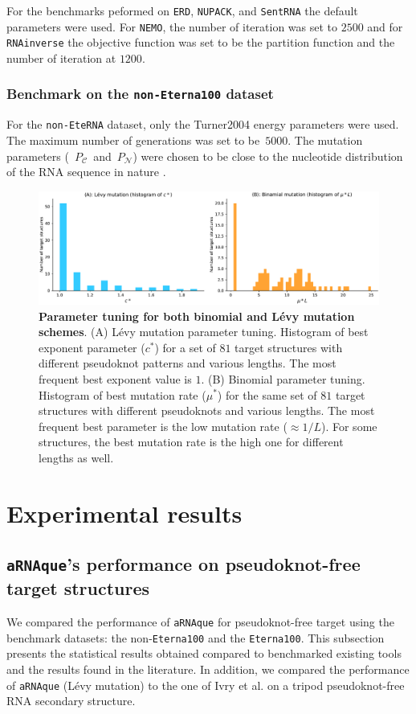 For the benchmarks peformed on \texttt{ERD}, \texttt{NUPACK}, and \texttt{SentRNA} the default parameters were used. For \texttt{NEMO}, the number of iteration was set to $2500$ and for \texttt{RNAinverse} the objective function was set to be the partition function and the number of iteration at $1200$. 
\subsubsection*{Benchmark on the \texttt{non-Eterna100} dataset}
For the \texttt{non-EteRNA} dataset,  only the Turner2004 energy parameters were used. The maximum number of generations was set to be~\(5000\). The mutation parameters (~\(P_{\mathcal{C}}\)~and~\(P_{\mathcal{N}}\)) were chosen to be close to the nucleotide distribution of the RNA sequence in nature \cite{esmaili2015erd}.  

\begin{figure}[t!]
	\includegraphics[width=1.0 \linewidth]{../res/images/arnaque/fig3.pdf}
	\caption{\textbf{Parameter tuning for both binomial and Lévy mutation schemes}. (A) Lévy mutation parameter tuning. Histogram of best exponent parameter ($c^*$) for a set of $81$ target structures with different pseudoknot patterns and various lengths. The most frequent best exponent value is $1$. (B) Binomial parameter tuning. Histogram of best mutation rate ($\mu^*$) for the same set of $81$ target structures with different pseudoknots and various lengths. The most frequent best parameter is the low mutation rate ($\approx 1/L$). For some structures, the best mutation rate is the high one for different lengths as well.} \label{Fig:tunning}
\end{figure}
\section{Experimental results}


\subsection{\texttt{aRNAque}'s performance on pseudoknot-free target structures }
We compared the performance of \texttt{aRNAque} for pseudoknot-free target using the benchmark datasets: the non-\texttt{Eterna100} and the \texttt{Eterna100}. This subsection presents the statistical results obtained compared to benchmarked existing tools and the results found in the literature. In addition, we compared the performance of \texttt{aRNAque} (Lévy mutation) to the one of Ivry et al. \cite{ivry2009image} on a tripod pseudoknot-free RNA secondary structure.

